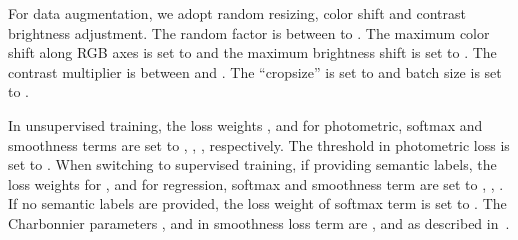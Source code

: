 \documentclass[runningheads]{llncs}
\begin{document}
For data augmentation, we adopt random resizing, color shift and contrast brightness adjustment. The random factor is between  to . The maximum color shift along RGB axes is set to  and the maximum brightness shift is set to . The contrast multiplier is between  and . The ``cropsize'' is set to  and batch size is set to . 

In unsupervised training, the loss weights ,  and  for photometric, softmax and smoothness terms are set to , , , respectively. The threshold  in photometric loss is set to . When switching to supervised training, if providing semantic labels, the loss weights for ,  and  for regression, softmax and smoothness term are set to , , . If no semantic labels are provided, the loss weight of softmax term is set to . The Charbonnier parameters ,  and  in smoothness loss term are ,  and  as described in~\cite{jason2016back}. 
\end{document}
